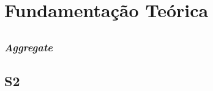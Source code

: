 \chapter{Fundamentação Teórica}
\label{cap:fundamentacao}


\section{} 

\subsection{\textit{Aggregate}}
\label{s1}

\section{S2} 
\label{s2}


